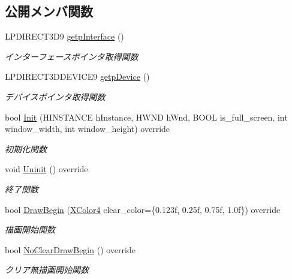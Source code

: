 \subsection*{公開メンバ関数}
\begin{DoxyCompactItemize}
\item 
L\+P\+D\+I\+R\+E\+C\+T3\+D9 \mbox{\hyperlink{class_renderer_direct_x9_aad68389e45dd757dcde19d636f082a21}{getp\+Interface}} ()
\begin{DoxyCompactList}\small\item\em インターフェースポインタ取得関数 \end{DoxyCompactList}\item 
L\+P\+D\+I\+R\+E\+C\+T3\+D\+D\+E\+V\+I\+C\+E9 \mbox{\hyperlink{class_renderer_direct_x9_afabcea127b5af61e4d80564369e72baa}{getp\+Device}} ()
\begin{DoxyCompactList}\small\item\em デバイスポインタ取得関数 \end{DoxyCompactList}\item 
bool \mbox{\hyperlink{class_renderer_direct_x9_af015676b50f3ce1ba7cf20abf6074e3b}{Init}} (H\+I\+N\+S\+T\+A\+N\+CE h\+Instance, H\+W\+ND h\+Wnd, B\+O\+OL is\+\_\+full\+\_\+screen, int window\+\_\+width, int window\+\_\+height) override
\begin{DoxyCompactList}\small\item\em 初期化関数 \end{DoxyCompactList}\item 
void \mbox{\hyperlink{class_renderer_direct_x9_af7ff314cbaa894d71e37c10565002f8f}{Uninit}} () override
\begin{DoxyCompactList}\small\item\em 終了関数 \end{DoxyCompactList}\item 
bool \mbox{\hyperlink{class_renderer_direct_x9_a5d299c19850d7c87340c3cbf2629cc01}{Draw\+Begin}} (\mbox{\hyperlink{_vector3_d_8h_a680c30c4a07d86fe763c7e01169cd6cc}{X\+Color4}} clear\+\_\+color=\{0.\+123f, 0.\+25f, 0.\+75f, 1.\+0f\}) override
\begin{DoxyCompactList}\small\item\em 描画開始関数 \end{DoxyCompactList}\item 
bool \mbox{\hyperlink{class_renderer_direct_x9_ad890dee4b4da01dfe75b0c8af9628f8b}{No\+Clear\+Draw\+Begin}} () override
\begin{DoxyCompactList}\small\item\em クリア無描画開始関数 \end{DoxyCompactList}\item 

\end{DoxyCompactItemize}
